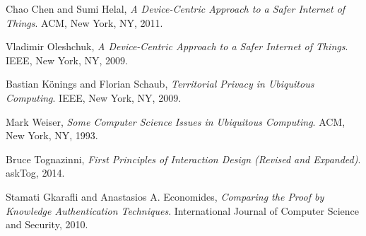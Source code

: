 \documentclass[11pt, oneside]{article}   	%
\begin{document}
\begin{thebibliography}{9}

  Chao Chen and Sumi Helal,
  \emph{A Device-Centric Approach to a Safer Internet of Things}.
  ACM, New York, NY,
  2011. %
  
  Vladimir Oleshchuk,
  \emph{A Device-Centric Approach to a Safer Internet of Things}.
  IEEE, New York, NY,
  2009.
  
  Bastian K{\"o}nings and Florian Schaub,
  \emph{Territorial Privacy in Ubiquitous Computing}.
  IEEE, New York, NY,
  2009.
  
  Mark Weiser,
  \emph{Some Computer Science Issues in Ubiquitous Computing}.
  ACM, New York, NY,
  1993.
  
  Bruce Tognazinni,
  \emph{First Principles of Interaction Design (Revised and Expanded)}.
  askTog, %
  2014.
  
  Stamati Gkarafli and Anastasios A. Economides,
  \emph{Comparing the Proof by Knowledge Authentication Techniques}.
  International Journal of Computer Science and Security,
  2010.



\end{thebibliography}
\end{document}
